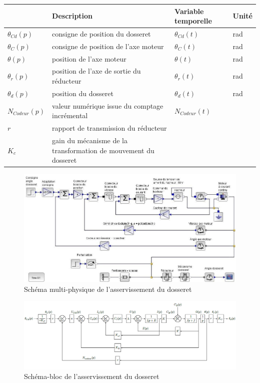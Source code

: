 \begin{tabular}{|p{2.5cm}|p{7cm}|p{2cm}|p{2cm}|}
\hline
 & \textbf{Description} & \textbf{Variable temporelle} & \textbf{Unité} \\
\hline
$\theta_{Cd}(p)$ & consigne de position du dosseret	& $\theta_{Cd}(t)$ & rad \\
\hline
$\theta_{C}(p)$ & consigne de position de l'axe moteur & $\theta_{C}(t)$ & rad \\
\hline
$\theta(p)$ & position de l'axe moteur & $\theta(t)$ & rad \\
\hline
$\theta_{r}(p)$ & position de l'axe de sortie du réducteur & $\theta_{r}(t)$ & rad \\
\hline
$\theta_{d}(p)$ & position du dosseret & $\theta_{d}(t)$ & rad \\
\hline
$N_{Codeur}(p)$ & valeur numérique issue du comptage incrémental & $N_{Codeur}(t)$ & 	 \\
\hline
$r$ & rapport de transmission du réducteur & &  \\
\hline
$K_{c}$ & gain du mécanisme  de la transformation de mouvement du dosseret & &  \\
\hline
\end{tabular}

\begin{figure}[!ht]
\begin{center}
 \includegraphics[width=\linewidth]{img/img05}
\end{center}
\caption{Schéma multi-physique  de l'asservissement du dosseret}
\label{fig5}
\end{figure}

\begin{figure}[!ht]
\begin{center}
 \includegraphics[width=\linewidth]{img/img06}
\end{center}
\caption{Schéma-bloc de l'asservissement du dosseret}
\label{fig6}
\end{figure}

